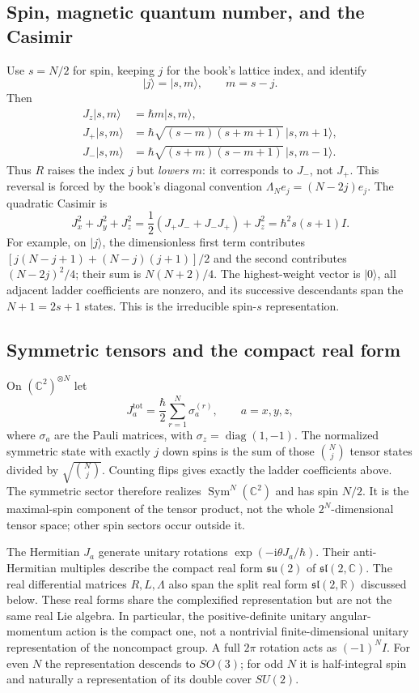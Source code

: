 \subsection{Spin, magnetic quantum number, and the Casimir}
Use $s=N/2$ for spin, keeping $j$ for the book's lattice index, and identify
\[
|j\rangle=|s,m\rangle,\qquad m=s-j.
\]
Then
\begin{align*}
J_z|s,m\rangle&=\hbar m|s,m\rangle,\\
J_+|s,m\rangle&=\hbar\sqrt{(s-m)(s+m+1)}\,|s,m+1\rangle,\\
J_-|s,m\rangle&=\hbar\sqrt{(s+m)(s-m+1)}\,|s,m-1\rangle.
\end{align*}
Thus $R$ raises the index $j$ but \emph{lowers} $m$: it corresponds to $J_-$, not $J_+$. This reversal is forced by the book's diagonal convention $\Lambda_Ne_j=(N-2j)e_j$.
The quadratic Casimir is
\begin{equation}\label{eq:angular-Casimir}
J_x^2+J_y^2+J_z^2
=\frac12(J_+J_-+J_-J_+)+J_z^2
=\hbar^2s(s+1)I.
\end{equation}
For example, on $|j\rangle$, the dimensionless first term contributes
$[j(N-j+1)+(N-j)(j+1)]/2$ and the second contributes $(N-2j)^2/4$; their sum is $N(N+2)/4$. The highest-weight vector is $|0\rangle$, all adjacent ladder coefficients are nonzero, and its successive descendants span the $N+1=2s+1$ states. This is the irreducible spin-$s$ representation.

\subsection{Symmetric tensors and the compact real form}
On $(\mathbb C^2)^{\otimes N}$ let
\[
J_a^{\mathrm{tot}}=\frac\hbar2\sum_{r=1}^N\sigma_a^{(r)},\qquad a=x,y,z,
\]
where $\sigma_a$ are the Pauli matrices, with $\sigma_z=\operatorname{diag}(1,-1)$. The normalized symmetric state with exactly $j$ down spins is the sum of those $\binom Nj$ tensor states divided by $\sqrt{\binom Nj}$. Counting flips gives exactly the ladder coefficients above. The symmetric sector therefore realizes $\operatorname{Sym}^N(\mathbb C^2)$ and has spin $N/2$. It is the maximal-spin component of the tensor product, not the whole $2^N$-dimensional tensor space; other spin sectors occur outside it.

The Hermitian $J_a$ generate unitary rotations $\exp(-\mathrm i\theta J_a/\hbar)$. Their anti-Hermitian multiples describe the compact real form $\mathfrak{su}(2)$ of $\mathfrak{sl}(2,\mathbb C)$. The real differential matrices $R,L,\Lambda$ also span the split real form $\mathfrak{sl}(2,\mathbb R)$ discussed below. These real forms share the complexified representation but are not the same real Lie algebra. In particular, the positive-definite unitary angular-momentum action is the compact one, not a nontrivial finite-dimensional unitary representation of the noncompact group.
A full $2\pi$ rotation acts as $(-1)^NI$. For even $N$ the representation descends to $SO(3)$; for odd $N$ it is half-integral spin and naturally a representation of its double cover $SU(2)$.

